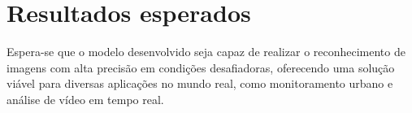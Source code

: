 \section{Resultados esperados}
Espera-se que o modelo desenvolvido seja capaz de realizar o reconhecimento de imagens com alta precisão em condições desafiadoras, oferecendo uma solução viável para diversas aplicações no mundo real, como monitoramento urbano e análise de vídeo em tempo real.
